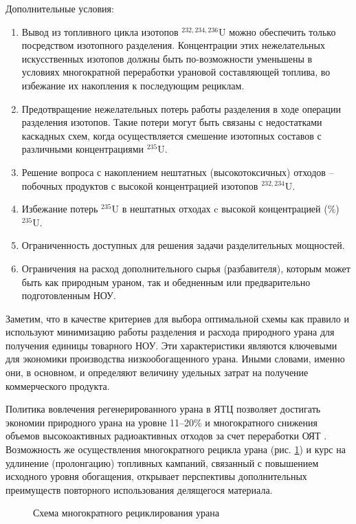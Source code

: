 Дополнительные условия:
\begin{enumerate}
  \item Вывод из топливного цикла изотопов $^{232,234,236}$U можно обеспечить только посредством изотопного разделения. Концентрации этих нежелательных искусственных изотопов должны быть по-возможности уменьшены в условиях многократной переработки урановой составляющей топлива, во избежание их накопления к последующим рециклам.
  \item Предотвращение нежелательных потерь работы разделения в ходе операции разделения изотопов. Такие потери могут быть связаны с недостатками каскадных схем, когда осуществляется смешение изотопных составов с различными концентрациями $^{235}$U. 
  \item Решение вопроса с накоплением нештатных (высокотоксичных) отходов -- побочных продуктов с высокой концентрацией изотопов $^{232,234}$U.
  \item Избежание потерь $^{235}$U  в нештатных отходах c высокой концентрацией (\%) $^{235}$U.
  \item Ограниченность доступных для решения задачи разделительных мощностей.
  \item Ограничения на расход дополнительного сырья (разбавителя), которым может быть как природным ураном, так и обедненным или предварительно подготовленным НОУ.
\end{enumerate}

Заметим, что в качестве критериев для выбора оптимальной схемы как правило и используют минимизацию работы разделения и расхода природного урана для получения единицы товарного НОУ. Эти характеристики являются ключевыми для экономики производства низкообогащенного урана. Иными словами, именно они, в основном, и определяют величину удельных затрат на получение коммерческого продукта.

Политика вовлечения регенерированного урана в ЯТЦ позволяет достигать экономии природного урана на уровне 11--20\% и многократного снижения объемов высокоактивных радиоактивных отходов за счет переработки ОЯТ \cite{delculAnalysisReuseUranium2009}. Возможность же осуществления многократного рецикла урана (рис. \ref{recycle}) и курс на удлинение (пролонгацию) топливных кампаний, связанный с повышением исходного уровня обогащения, открывает перспективы дополнительных преимуществ повторного использования делящегося материала.

\begin{figure}[ht]
  \caption{Схема многократного рециклирования урана}\label{recycle}
\end{figure}

